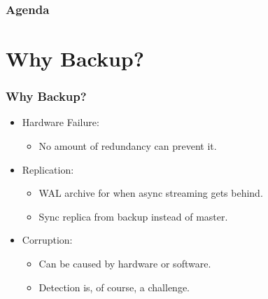 %
\def\mytitle{Efficiently Backing up Terabytes of Data with pgBackRest}
\def\mysubject{}
\def\myevent{PGDay Russia 2017}
\def\myauthor{David Steele}
\def\myemail{}
\def\mydate{July 6, 2017}

\def\mysuppressnav{}

\def\mytemplatepath{/template/}


\begin{frame}
    \frametitle{Agenda}
    \tableofcontents
\end{frame}

\section{Why Backup?}

\begin{frame}
    \frametitle{Why Backup?}

    \begin{itemize}
        \item Hardware Failure:

        \begin{itemize}
            \item No amount of redundancy can prevent it.\pause
        \end{itemize}

        \item Replication:

        \begin{itemize}
            \item WAL archive for when async streaming gets behind.\pause
            \item Sync replica from backup instead of master.\pause
        \end{itemize}

        \item Corruption:

        \begin{itemize}
            \item Can be caused by hardware or software.\pause
            \item Detection is, of course, a challenge.
        \end{itemize}
    \end{itemize}
\end{frame}

